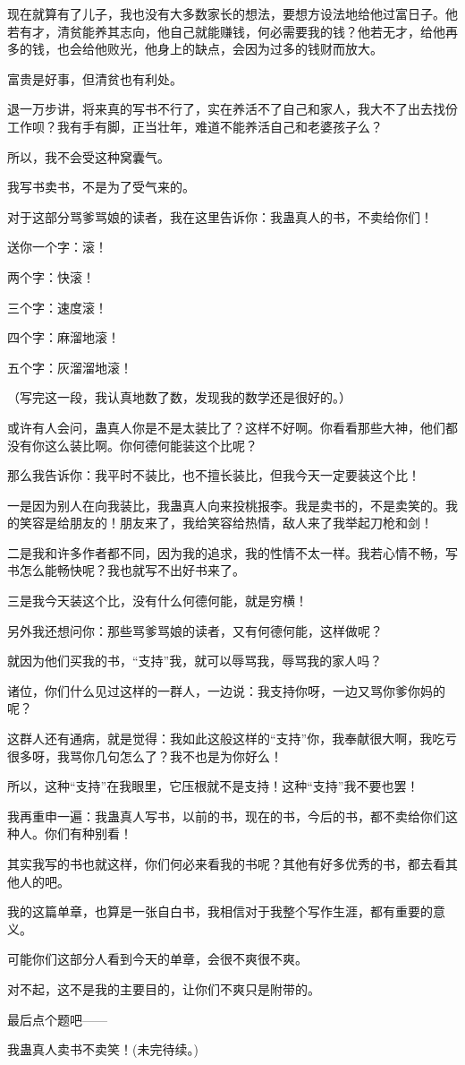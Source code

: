 \begin{this_body}
现在就算有了儿子，我也没有大多数家长的想法，要想方设法地给他过富日子。他若有才，清贫能养其志向，他自己就能赚钱，何必需要我的钱？他若无才，给他再多的钱，也会给他败光，他身上的缺点，会因为过多的钱财而放大。

富贵是好事，但清贫也有利处。

退一万步讲，将来真的写书不行了，实在养活不了自己和家人，我大不了出去找份工作呗？我有手有脚，正当壮年，难道不能养活自己和老婆孩子么？

所以，我不会受这种窝囊气。

我写书卖书，不是为了受气来的。

对于这部分骂爹骂娘的读者，我在这里告诉你：我蛊真人的书，不卖给你们！

送你一个字：滚！

两个字：快滚！

三个字：速度滚！

四个字：麻溜地滚！

五个字：灰溜溜地滚！

（写完这一段，我认真地数了数，发现我的数学还是很好的。）

或许有人会问，蛊真人你是不是太装比了？这样不好啊。你看看那些大神，他们都没有你这么装比啊。你何德何能装这个比呢？

那么我告诉你：我平时不装比，也不擅长装比，但我今天一定要装这个比！

一是因为别人在向我装比，我蛊真人向来投桃报李。我是卖书的，不是卖笑的。我的笑容是给朋友的！朋友来了，我给笑容给热情，敌人来了我举起刀枪和剑！

二是我和许多作者都不同，因为我的追求，我的性情不太一样。我若心情不畅，写书怎么能畅快呢？我也就写不出好书来了。

三是我今天装这个比，没有什么何德何能，就是穷横！

另外我还想问你：那些骂爹骂娘的读者，又有何德何能，这样做呢？

就因为他们买我的书，“支持”我，就可以辱骂我，辱骂我的家人吗？

诸位，你们什么见过这样的一群人，一边说：我支持你呀，一边又骂你爹你妈的呢？

这群人还有通病，就是觉得：我如此这般这样的“支持”你，我奉献很大啊，我吃亏很多呀，我骂你几句怎么了？我不也是为你好么！

所以，这种“支持”在我眼里，它压根就不是支持！这种“支持”我不要也罢！

我再重申一遍：我蛊真人写书，以前的书，现在的书，今后的书，都不卖给你们这种人。你们有种别看！

其实我写的书也就这样，你们何必来看我的书呢？其他有好多优秀的书，都去看其他人的吧。

我的这篇单章，也算是一张自白书，我相信对于我整个写作生涯，都有重要的意义。

可能你们这部分人看到今天的单章，会很不爽很不爽。

对不起，这不是我的主要目的，让你们不爽只是附带的。

最后点个题吧——

我蛊真人卖书不卖笑！(未完待续。)

\end{this_body}

